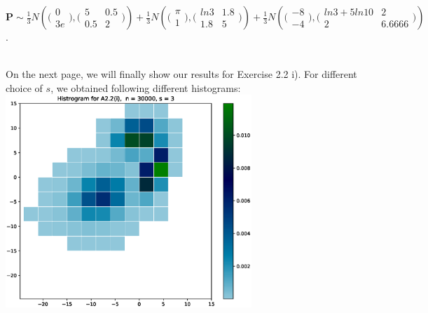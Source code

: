 \documentclass{article}
\begin{document}
\begin{center} \vspace*{-0.8cm}
$\mathbf{P} \sim \frac{1}{3} N ( \bigl(\begin{smallmatrix} 0 \\ 3e \end{smallmatrix}\bigr), \bigl(\begin{smallmatrix} 5 & 0.5\\ 0.5 & 2 \end{smallmatrix}\bigr) ) + \frac{1}{3} N ( \bigl(\begin{smallmatrix} \pi \\ 1 \end{smallmatrix}\bigr), \bigl(\begin{smallmatrix} ln3 & 1.8\\ 1.8 & 5 \end{smallmatrix}\bigr) ) + \frac{1}{3} N ( \bigl(\begin{smallmatrix} -8 \\ -4 \end{smallmatrix}\bigr), \bigl(\begin{smallmatrix} ln3+5ln10 & 2\\ 2 & 6.6666 \end{smallmatrix}\bigr) )$.
\end{center} \ \vspace*{-0.7cm}\\
On the next page, we will finally show our results for Exercise 2.2 i). 
\newpage
For different choice of $s$, we obtained following different histograms: \\
\hspace*{-1.5cm}\includegraphics[height=8cm]{Figures_for_A2.2_i//1.eps} \hspace*{-1.5cm}
\end{document}
